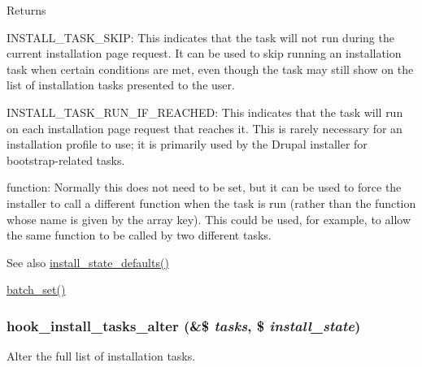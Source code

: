 \begin{DoxyReturn}{Returns}
\begin{DoxyItemize}
\begin{DoxyItemize}
\item INSTALL\_\-TASK\_\-SKIP: This indicates that the task will not run during the current installation page request. It can be used to skip running an installation task when certain conditions are met, even though the task may still show on the list of installation tasks presented to the user.
\item INSTALL\_\-TASK\_\-RUN\_\-IF\_\-REACHED: This indicates that the task will run on each installation page request that reaches it. This is rarely necessary for an installation profile to use; it is primarily used by the Drupal installer for bootstrap-\/related tasks.
\end{DoxyItemize}
\item function: Normally this does not need to be set, but it can be used to force the installer to call a different function when the task is run (rather than the function whose name is given by the array key). This could be used, for example, to allow the same function to be called by two different tasks.
\end{DoxyItemize}
\end{DoxyReturn}
\begin{DoxySeeAlso}{See also}
\hyperlink{install_8core_8inc_ab52bef71652d133045e4182da84a33b8}{install\_\-state\_\-defaults()} 

\hyperlink{group__batch_ga9ff3f18b3bdd1d62ab7ac681a22a7170}{batch\_\-set()} 
\end{DoxySeeAlso}
\hypertarget{group__hooks_ga71d761aa86808ce445157b271cb77a25}{
\subsubsection[{hook\_\-install\_\-tasks\_\-alter}]{\setlength{\rightskip}{0pt plus 5cm}hook\_\-install\_\-tasks\_\-alter (\&\$ {\em tasks}, \/  \$ {\em install\_\-state})}}
\label{group__hooks_ga71d761aa86808ce445157b271cb77a25}
Alter the full list of installation tasks.


